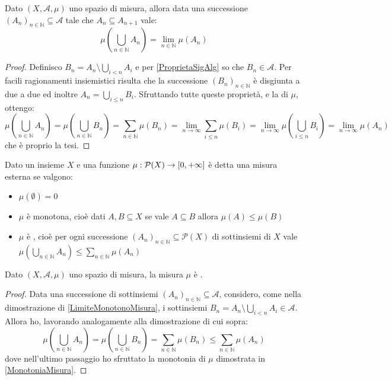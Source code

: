 \begin{proposition}\label{LimiteMonotonoMisura}
	Dato $(X,\mathcal A,\mu)$ uno spazio di misura, allora data una successione $(A_n)_{n\in\mathbb N}\subseteq \mathcal A$ tale che $A_n\subseteq A_{n+1}$ vale:
	\begin{equation*}
		\mu\left(\bigcup_{n\in\mathbb N} A_n\right)=\lim_{n\in\mathbb N} \mu(A_n)
	\end{equation*}
\end{proposition}
\begin{proof}
	Definisco $B_n=A_n\setminus\bigcup_{i<n}A_i$ e per \cref{ProprietaSigAlg} so che $B_n\in\mathcal A$.
	Per facili ragionamenti insiemistici risulta che la successione $(B_n)_{n\in\mathbb N}$ è disgiunta a due a due ed inoltre $A_n=\bigcup_{i\le n}B_i$.
	Sfruttando tutte queste proprietà, e la \sigadd[ità] di $\mu$, ottengo:
	\begin{equation*}
		\mu\left(\bigcup_{n\in\mathbb N} A_n\right)=\mu\left(\bigcup_{n\in\mathbb N} B_n\right)=
		\sum_{n\in\mathbb N} \mu(B_n)=\lim_{n\to\infty} \sum_{i\le n} \mu(B_i)=
		\lim_{n\to\infty} \mu\left(\bigcup_{i\le n} B_i\right)=\lim_{n\to\infty} \mu(A_n)
	\end{equation*}
	che è proprio la tesi.
\end{proof}

\begin{definition}
	Dato un insieme $X$ e una funzione $\mu:\mathcal P(X)\to [0,+\infty]$ è detta una misura esterna se valgono:
	\begin{itemize}
		\item $\mu(\emptyset)=0$
		\item $\mu$ è monotona, cioè dati $A,B\subseteq X$ se vale $A\subseteq B$ allora $\mu(A)\le \mu(B)$
		\item $\mu$ è \sigsubadd{}, cioè  per ogni successione $(A_n)_{n\in\mathbb N}\subseteq \mathcal P(X)$ di sottinsiemi di $X$ vale $\mu\left(\bigcup_{n\in\mathbb{N}}A_n\right)\le \sum_{n\in\mathbb N} \mu(A_n)$
	\end{itemize}
\end{definition}

\begin{remark}
	Dato $(X,\mathcal A,\mu)$ uno spazio di misura, la misura $\mu$ è \sigsubadd{}.
\end{remark}
\begin{proof}
	Data una successione di sottinsiemi $(A_n)_{n\in\mathbb N}\subseteq \mathcal A$, considero, come nella dimostrazione di \cref{LimiteMonotonoMisura}, i sottinsiemi $B_n=A_n\setminus\bigcup_{i<n}A_i\in\mathcal A$.
	Allora ho, lavorando analogamente alla dimostrazione di cui sopra:
	\begin{equation*}
		\mu\left(\bigcup_{n\in\mathbb N} A_n\right)=\mu\left(\bigcup_{n\in\mathbb N} B_n\right)=
		\sum_{n\in\mathbb N} \mu(B_n)\le \sum_{n\in\mathbb N} \mu(A_n)
	\end{equation*}
	dove nell'ultimo passaggio ho sfruttato la monotonia di $\mu$ dimostrata in \cref{MonotoniaMisura}.
\end{proof}

